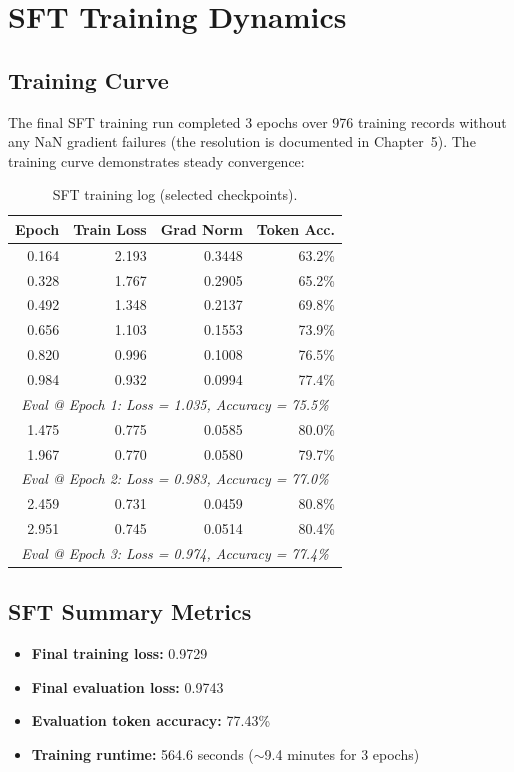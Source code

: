 \documentclass[12pt]{report}
\begin{document}
\section{SFT Training Dynamics}

\subsection{Training Curve}

The final SFT training run completed 3 epochs over 976 training records without any NaN gradient failures (the resolution is documented in Chapter~5). The training curve demonstrates steady convergence:

\begin{table}[H]
\centering
\caption{SFT training log (selected checkpoints).}
\label{tab:sft_curve}
\begin{tabular}{rrrr}
\toprule
\textbf{Epoch} & \textbf{Train Loss} & \textbf{Grad Norm} & \textbf{Token Acc.} \\
\midrule
0.164 & 2.193 & 0.3448 & 63.2\% \\
0.328 & 1.767 & 0.2905 & 65.2\% \\
0.492 & 1.348 & 0.2137 & 69.8\% \\
0.656 & 1.103 & 0.1553 & 73.9\% \\
0.820 & 0.996 & 0.1008 & 76.5\% \\
0.984 & 0.932 & 0.0994 & 77.4\% \\
\midrule
\multicolumn{4}{c}{\textit{Eval @ Epoch 1: Loss = 1.035, Accuracy = 75.5\%}} \\
\midrule
1.475 & 0.775 & 0.0585 & 80.0\% \\
1.967 & 0.770 & 0.0580 & 79.7\% \\
\midrule
\multicolumn{4}{c}{\textit{Eval @ Epoch 2: Loss = 0.983, Accuracy = 77.0\%}} \\
\midrule
2.459 & 0.731 & 0.0459 & 80.8\% \\
2.951 & 0.745 & 0.0514 & 80.4\% \\
\midrule
\multicolumn{4}{c}{\textit{Eval @ Epoch 3: Loss = 0.974, Accuracy = 77.4\%}} \\
\bottomrule
\end{tabular}
\end{table}

\subsection{SFT Summary Metrics}

\begin{itemize}
    \item \textbf{Final training loss:} 0.9729
    \item \textbf{Final evaluation loss:} 0.9743
    \item \textbf{Evaluation token accuracy:} 77.43\%
    \item \textbf{Training runtime:} 564.6 seconds ($\sim$9.4 minutes for 3 epochs)
\end{itemize}
\end{document}
